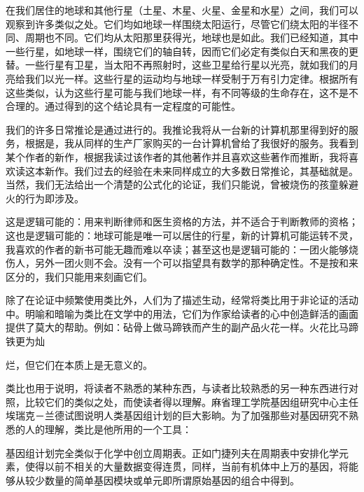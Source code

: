 \begin{examplebox}[title=类比论证实例二：行星生命假说]
在我们居住的地球和其他行星（土星、木星、火星、金星和水星）之间，我们可以观察到许多类似之处。它们均如地球一样围绕太阳运行，尽管它们绕太阳的半径不同、周期也不同。它们均从太阳那里获得光，地球也是如此。我们已经知道，其中一些行星，如地球一样，围绕它们的轴自转，因而它们必定有类似白天和黑夜的更替。一些行星有卫星，当太阳不再照射时，这些卫星给行星以光亮，就如我们的月亮给我们以光一样。这些行星的运动均与地球一样受制于万有引力定律。根据所有这些类似，认为这些行星可能与我们地球一样，有不同等级的生命存在，这不是不合理的。通过得到的这个结论具有一定程度的可能性。\cite{reid1785}
\end{examplebox}

我们的许多日常推论是通过进行的。我推论我将从一台新的计算机那里得到好的服务，根据是，我从同样的生产厂家购买的一台计算机曾给了我很好的服务。我看到某个作者的新作，根据我读过该作者的其他著作并且喜欢这些著作而推断，我将喜欢读这本新作。我们过去的经验在未来同样成立的大多数日常推论，其基础就是。当然，我们无法给出一个清楚的公式化的论证，我们只能说，曾被烧伤的孩童躲避火的行为即涉及。

这是逻辑可能的：用来判断律师和医生资格的方法，并不适合于判断教师的资格；这也是逻辑可能的：地球可能是唯一可以居住的行星，新的计算机可能运转不灵，我喜欢的作者的新书可能无趣而难以卒读；甚至这也是逻辑可能的：一团火能够烧伤人，另外一团火则不会。没有一个可以指望具有数学的那种确定性。不是按和来区分的，我们只能用来刻画它们。

除了在论证中频繁使用类比外，人们为了描述生动，经常将类比用于非论证的活动中。明喻和暗喻为类比在文学中的用法，它们为作家给读者的心中创造鲜活的画面提供了莫大的帮助。例如：砧骨上做马蹄铁而产生的副产品火花一样。火花比马蹄铁更为灿

烂，但它们在本质上是无意义的。\cite{chesterton1910}

类比也用于说明，将读者不熟悉的某种东西，与读者比较熟悉的另一种东西进行对照，比较它们的类似之处，而使读者得以理解。麻省理工学院基因组研究中心主任埃瑞克－兰德试图说明人类基因组计划的巨大影晌。为了加强那些对基因研究不熟悉的人的理解，类比是他所用的一个工具：

基因组计划完全类似于化学中创立周期表。正如门捷列夫在周期表中安排化学元素，使得以前不相关的大量数据变得连贯，同样，当前有机体中上万的基因，将能够从较少数量的简单基因模块或单元即所谓原始基因的组合中得到。\cite{lander1995}

